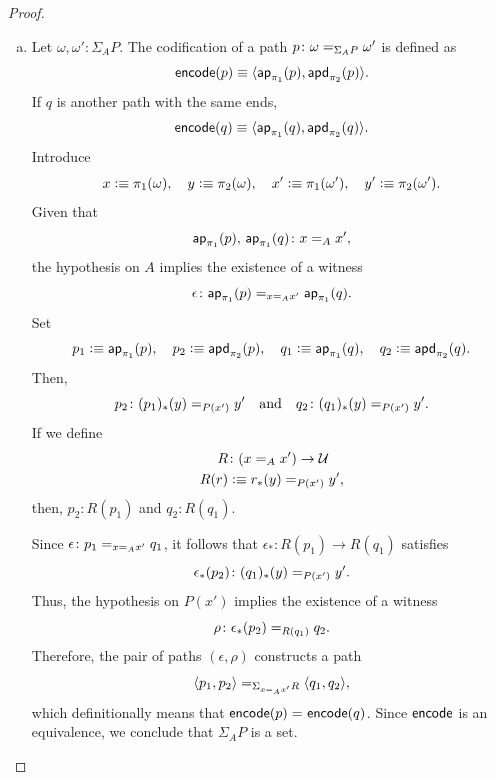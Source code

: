 \begin{proof}
\begin{enumerate}[a),font=\upshape]
        \item Let $\omega,\omega'\colon\Sigma_AP$. The codification of a path $p\colon\omega\eq{\Sigma_AP}\omega'$ is defined as
        \[
            \mathsf{encode}(p)\equiv
            \langle\mathsf{ap}_{\pi_1}(p),\mathsf{apd}_{\pi_2}(p)\rangle.
        \]
        If $q$ is another path with the same ends,
        \[
            \mathsf{encode}(q)\equiv
            \langle\mathsf{ap}_{\pi_1}(q),\mathsf{apd}_{\pi_2}(q)\rangle.
        \]
        Introduce
        \[
            x\mathrel{\vcentcolon}\equiv\pi_1(\omega),\quad y\mathrel{\vcentcolon}\equiv\pi_2(\omega),\quad
            x'\mathrel{\vcentcolon}\equiv\pi_1(\omega'),\quad y'\mathrel{\vcentcolon}\equiv\pi_2(\omega').
        \]
        Given that
        \[
            \fun{ap}_{\pi_1}(p),\,\fun{ap}_{\pi_1}(q)\colon x\eq Ax',
        \]
        the hypothesis on $A$ implies the existence of a witness
        \[
            \epsilon\colon\fun{ap}_{\pi_1}(p)
                \eq{x\eq Ax'}
                \fun{ap}_{\pi_1}(q).
        \]
        Set
        \[
            p_1\mathrel{\vcentcolon}\equiv\mathsf{ap}_{\pi_1}(p),\quad p_2\mathrel{\vcentcolon}\equiv\mathsf{apd}_{\pi_2}(p),
            \quad
            q_1\mathrel{\vcentcolon}\equiv\mathsf{ap}_{\pi_1}(q),\quad q_2\mathrel{\vcentcolon}\equiv\mathsf{apd}_{\pi_2}(q).
        \]
        Then,
        \[
            p_2\colon(p_1)_*(y)\eq{P(x')}y'
            \quad\text{and}\quad
            q_2\colon(q_1)_*(y)\eq{P(x')}y'.
        \]
        If we define
        \begin{align*}
            R&\colon(x\eq Ax')\to\univ\\
            R(r)&\defeq r_*(y)\eq{P(x')}y',
        \end{align*}
        then, $p_2\colon R(p_1)$ and $q_2\colon R(q_1)$.
        
        Since $\epsilon\colon p_1\eq{x\eq Ax'}q_1$, it follows that  $\epsilon_*\colon R(p_1)\to R(q_1)$ satisfies
        \[
            \epsilon_*(p_2)
                \colon(q_1)_*(y)\eq{P(x')}y'.
        \]
        Thus, the hypothesis on $P(x')$ implies the existence of a witness
        \[
            \rho\colon\epsilon_*(p_2)\eq{R(q_1)}q_2.
        \]
        Therefore, the pair of paths $(\epsilon,\rho)$ constructs a path
        \[
            \langle p_1,p_2\rangle
            \mathrel{=_{\Sigma_{x\mathrel{=_{A}}x'}R}}
            \langle q_1,q_2\rangle,
        \]
        which definitionally means that $\mathsf{encode}(p)\mathrel{=_{}}\mathsf{encode}(q)$. Since $\mathsf{encode}$ is an equivalence, we conclude that $\Sigma_AP$ is a set.


\end{enumerate}
\end{proof}

